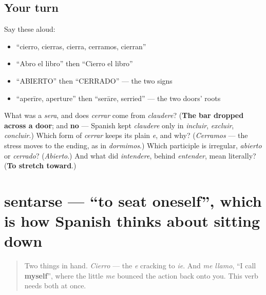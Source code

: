 \subsection*{Your turn}
Say these aloud:

\begin{itemize}
\raggedright
  \item \textquotedblleft{}cierro, cierras, cierra, cerramos, cierran\textquotedblright{}
  \item \textquotedblleft{}Abro el libro\textquotedblright{} then \textquotedblleft{}Cierro el libro\textquotedblright{}
  \item \textquotedblleft{}ABIERTO\textquotedblright{} then \textquotedblleft{}CERRADO\textquotedblright{} — the two signs
  \item \textquotedblleft{}aperīre, aperture\textquotedblright{} then \textquotedblleft{}serāre, serried\textquotedblright{} — the two doors' roots
\end{itemize}

\begin{tcolorbox}[breakable,colback=teal!4,colframe=teal!35!black,title={Before you move on}]
What was a \emph{sera}, and does \emph{cerrar} come from \emph{claudere}? (\textbf{The bar dropped across a door}; and \textbf{no} — Spanish kept \emph{claudere} only in \emph{incluir}, \emph{excluir}, \emph{concluir}.) Which form of \emph{cerrar} keeps its plain \emph{e}, and why? (\emph{Cerramos} — the stress moves to the ending, as in \emph{dormimos}.) Which participle is irregular, \emph{abierto} or \emph{cerrado}? (\emph{Abierto}.) And what did \emph{intendere}, behind \emph{entender}, mean literally? (\textbf{To stretch toward}.)
\end{tcolorbox}
\section[sentarse]{sentarse — \textquotedblleft{}to seat oneself\textquotedblright{}, which is how Spanish thinks about sitting down}

\label{lesson:ES-C37-sentarse}



\begin{quote}
Two things in hand. \emph{Cierro} — the \emph{e} cracking to \emph{ie}. And \emph{me llamo}, \textquotedblleft{}I call \textbf{myself}\textquotedblright{}, where the little \emph{me} bounced the action back onto you. This verb needs both at once.
\end{quote}

